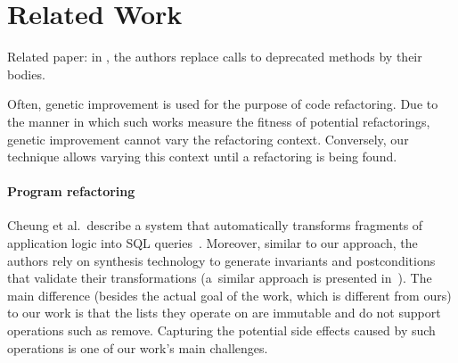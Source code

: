 \documentclass[runningheads,a4paper]{llncs}
\begin{document}
  
\section{Related Work}

Related paper: in \cite{DBLP:conf/paste/Perkins05}, the authors
replace calls to deprecated methods by their bodies.

Often, genetic improvement
\cite{DBLP:journals/dagstuhl-reports/PetkeGFL18} is used for the
purpose of code refactoring. Due to the manner in which such works measure
the fitness of potential refactorings, genetic improvement cannot vary
the refactoring context.  Conversely, our technique allows varying this
context until a refactoring is being found.

\paragraph{Program refactoring}

Cheung et al.~describe a system that automatically transforms fragments of
application logic into SQL queries~\cite{DBLP:conf/pldi/CheungSM13}. 
Moreover, similar to our approach, the authors rely on synthesis technology
to generate invariants and postconditions that validate their
transformations (a~similar approach is presented
in~\cite{DBLP:conf/cc/IuCZ10}).  The main difference (besides the actual
goal of the work, which is different from ours) to our work is that the
lists they operate on are immutable and do not support operations such as
remove.  Capturing the potential side effects caused by such operations is
one of our work's main challenges.
\end{document}

